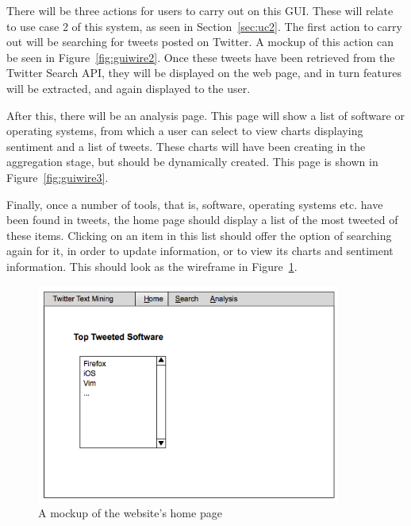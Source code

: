 There will be three actions for users to carry out on this GUI. These will relate to use case 2 of this system, as seen in Section~\ref{sec:uc2}. The first action to carry out will be searching for tweets posted on Twitter. A mockup of this action can be seen in Figure~\ref{fig:guiwire2}. Once these tweets have been retrieved from the Twitter Search API, they will be displayed on the web page, and in turn features will be extracted, and again displayed to the user.

After this, there will be an analysis page. This page will show a list of software or operating systems, from which a user can select to view charts displaying sentiment and a list of tweets. These charts will have been creating in the aggregation stage, but should be dynamically created. This page is shown in Figure~\ref{fig:guiwire3}.

Finally, once a number of tools, that is, software, operating systems etc. have been found in tweets, the home page should display a list of the most tweeted of these items. Clicking on an item in this list should offer the option of searching again for it, in order to update information, or to view its charts and sentiment information. This should look as the wireframe in Figure~\ref{fig:guiwire1}.

\begin{figure}[h]
\begin{center}
\includegraphics[width=10cm]{guiwire1}
\end{center}
\caption{A mockup of the website's home page}
\label{fig:guiwire1}
\end{figure}

